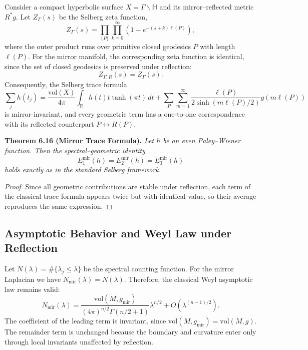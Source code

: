 Consider a compact hyperbolic surface \(X=\Gamma\backslash\mathbb{H}\)
and its mirror–reflected metric \(R^{*}g\).
Let \(Z_{\Gamma}(s)\) be the Selberg zeta function,
\[
Z_{\Gamma}(s)
=\prod_{\{P\}}\prod_{k=0}^{\infty}
\left(1-e^{-(s+k)\ell(P)}\right),
\]
where the outer product runs over primitive closed geodesics \(P\)
with length \(\ell(P)\).
For the mirror manifold,
the corresponding zeta function is identical,
since the set of closed geodesics is preserved under reflection:
\begin{equation}
Z_{\Gamma,R}(s)
=Z_{\Gamma}(s).
\end{equation}
Consequently, the Selberg trace formula
\[
\sum_{j}h(t_j)
=\frac{\mathrm{vol}(X)}{4\pi}\int_{\mathbb{R}}h(t)t\tanh(\pi t)\,dt
+\sum_{P}\sum_{m=1}^{\infty}
\frac{\ell(P)}{2\sinh(m\ell(P)/2)}g(m\ell(P))
\]
is mirror-invariant,
and every geometric term has a one-to-one correspondence
with its reflected counterpart \(P\leftrightarrow R(P)\).

\textbf{Theorem 6.16 (Mirror Trace Formula).}
\emph{Let \(h\) be an even Paley–Wiener function.
Then the spectral–geometric identity}
\[
E_{1}^{\mathrm{mir}}(h)
=E_{2}^{\mathrm{mir}}(h)
=E_{3}^{\mathrm{mir}}(h)
\]
\emph{holds exactly as in the standard Selberg framework.}

\begin{proof}
Since all geometric contributions are stable under reflection,
each term of the classical trace formula
appears twice but with identical value,
so their average reproduces the same expression.
\end{proof}

\subsection{Asymptotic Behavior and Weyl Law under Reflection}\relax \hspace{0pt}

Let \(N(\lambda)=\#\{\lambda_j\le\lambda\}\)
be the spectral counting function.
For the mirror Laplacian we have
\(N_{\mathrm{mir}}(\lambda)=N(\lambda)\).
Therefore, the classical Weyl asymptotic law
remains valid:
\begin{equation}
N_{\mathrm{mir}}(\lambda)
=\frac{\mathrm{vol}(M,g_{\mathrm{mir}})}{(4\pi)^{n/2}\Gamma(n/2+1)}\lambda^{n/2}
+O(\lambda^{(n-1)/2}).
\end{equation}
The coefficient of the leading term is invariant,
since \(\mathrm{vol}(M,g_{\mathrm{mir}})=\mathrm{vol}(M,g)\).
The remainder term is unchanged because the boundary and curvature
enter only through local invariants unaffected by reflection.

